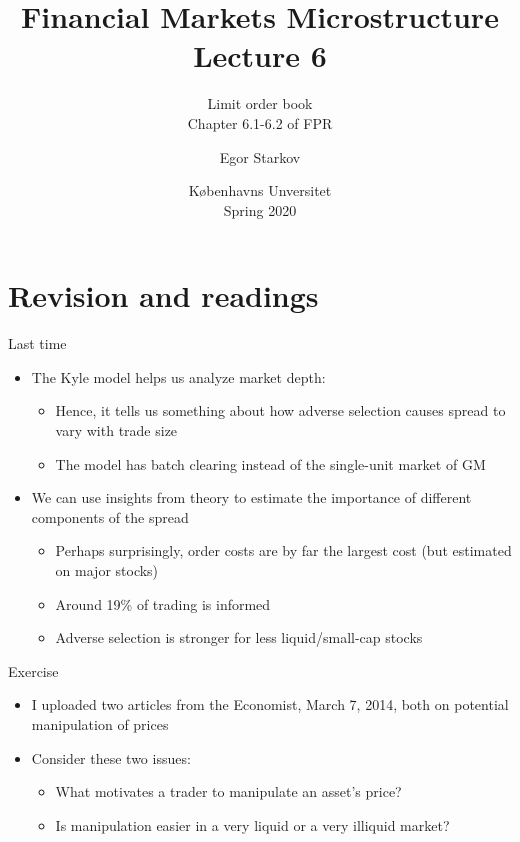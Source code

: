 \documentclass[english,10pt
,aspectratio=169
]{beamer}
\title{Financial Markets Microstructure \\ Lecture 6}
\subtitle{Limit order book\\
	Chapter 6.1-6.2 of FPR}
\author{Egor Starkov}
\date{K{\o}benhavns Unversitet \\
	Spring 2020}
\begin{document}
\frame[plain]{\titlepage}

\section{Revision and readings}

\begin{frame}{Last time}
	\begin{itemize}
		\item The Kyle model helps us analyze market depth:
		\begin{itemize}
			\item Hence, it tells us something about how adverse selection causes spread to vary with trade size
			\item The model has batch clearing instead of the single-unit market of GM
		\end{itemize}
		\item We can use insights from theory to estimate the importance of different components of the spread
		\begin{itemize}
			\item Perhaps surprisingly, order costs are by far the largest cost (but estimated on major stocks)
			\item Around 19\% of trading is informed
			\item Adverse selection is stronger for less liquid/small-cap stocks
		\end{itemize}
	\end{itemize}
\end{frame}


\begin{frame}{Exercise}
	\begin{itemize}
		\item I uploaded two articles from the Economist, March 7, 2014, both on potential manipulation of prices
		\item Consider these two issues:
		\begin{itemize}
			\item What motivates a trader to manipulate an asset's price? 
			\item Is manipulation easier in a very liquid or a very illiquid market?
		\end{itemize}
	\end{itemize}
\end{frame}
\end{document}
